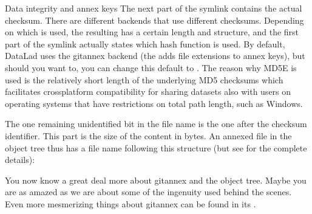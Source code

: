 \begin{findoutmore}[label={fom-objecttree}, before title={\thetcbcounter\ }, float, floatplacement=tbp, check odd page=true]{Data integrity and annex keys}
\sphinxAtStartPar
The next part of the symlink contains the actual checksum.
There are different {\hyperref[\detokenize{glossary:term-annex-key}]{}} backends that use different checksums.
Depending on which is used, the resulting {\hyperref[\detokenize{glossary:term-checksum}]{}} has a certain length and structure, and the first part of the symlink actually states which hash function is used.
By default, DataLad uses the  git\sphinxhyphen{}annex backend (the  adds file extensions to annex keys), but should you want to, you can change this default to .
The reason why MD5E is used is the relatively short length of the underlying MD5 checksums \textendash{} which facilitates cross\sphinxhyphen{}platform compatibility for sharing datasets also with users on operating systems that have restrictions on total path length, such as Windows.

\sphinxAtStartPar
The one remaining unidentified bit in the file name is the one after the checksum identifier.
This part is the size of the content in bytes.
An annexed file in the object tree thus has a file name following this structure
(but see  for the complete details):

\sphinxAtStartPar
{}

\sphinxAtStartPar
You now know a great deal more about git\sphinxhyphen{}annex and the object tree.
Maybe you are as amazed as we are about some of the ingenuity used behind the scenes.
Even more mesmerizing things about git\sphinxhyphen{}annex can be found in its .


\end{findoutmore}

\vspace{1cm}


\ignorespaces 

